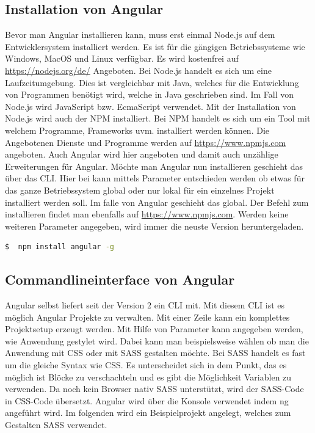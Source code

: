 \subsection{Installation von Angular}
Bevor man Angular installieren kann, muss erst einmal Node.js auf dem Entwicklersystem installiert werden. Es ist für die gängigen Betriebssysteme wie Windows, MacOS und Linux verfügbar. Es wird kostenfrei auf \url{https://nodejs.org/de/} Angeboten. Bei Node.js handelt es sich um eine Laufzeitumgebung. \autocite{Node.js.2018} Dies ist vergleichbar mit Java, welches für die Entwicklung von Programmen benötigt wird, welche in Java geschrieben sind. Im Fall von Node.js wird JavaScript \ac{bzw.} EcmaScript verwendet. Mit der Installation von Node.js wird auch der \ac{NPM} installiert. Bei \ac{NPM} handelt es sich um ein Tool mit welchem Programme, Frameworks \ac{uvm.} installiert werden können. Die Angebotenen Dienste und Programme werden auf \url{https://www.npmjs.com} angeboten. Auch Angular wird hier angeboten und damit auch unzählige Erweiterungen für Angular. Möchte man Angular nun installieren geschieht das über das \acl{CLI}. Hier bei kann mittels Parameter entschieden werden ob etwas für das ganze Betriebssystem global oder nur lokal für ein einzelnes Projekt installiert werden soll. Im falle von Angular geschieht das global. Der Befehl zum installieren findet man ebenfalls auf \url{https://www.npmjs.com}. Werden keine weiteren Parameter angegeben, wird immer die neuste Version heruntergeladen.

\begin{lstlisting}[language=sh, frame=single]
$  npm install angular -g
\end{lstlisting} 

\subsection{Commandlineinterface von Angular}
Angular selbst liefert seit der Version 2 ein \acl{CLI} mit. Mit diesem \ac{CLI} ist es möglich Angular Projekte zu verwalten. Mit einer Zeile kann ein komplettes Projektsetup erzeugt werden. Mit Hilfe von Parameter kann angegeben werden, wie Anwendung gestylet wird. Dabei kann man beispielsweise wählen ob man die Anwendung mit \ac{CSS} oder mit \ac{SASS} gestalten möchte. Bei \ac{SASS} handelt es fast um die gleiche Syntax wie \ac{CSS}. Es unterscheidet sich in dem Punkt, das es möglich ist Blöcke zu verschachteln und es gibt die Möglichkeit Variablen zu verwenden. Da noch kein Browser nativ \ac{SASS} unterstützt, wird der \ac{SASS}-Code in \ac{CSS}-Code übersetzt. Angular wird über die Konsole verwendet indem ng angeführt wird. Im folgenden wird ein Beispielprojekt angelegt, welches zum Gestalten \ac{SASS} verwendet.



